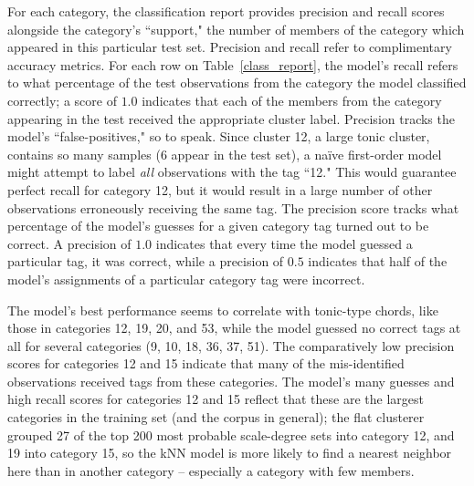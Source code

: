 For each category, the classification report provides precision and recall scores alongside the category's ``support," the number of members of the category which appeared in this particular test set.  Precision and recall refer to complimentary accuracy metrics.  For each row on Table~\ref{class_report}, the model's recall refers to what percentage of the test observations from the category the model classified correctly; a score of $1.0$ indicates that each of the members from the category appearing in the test received the appropriate cluster label.  Precision tracks the model's ``false-positives," so to speak.  Since cluster 12, a large tonic cluster, contains so many samples (6 appear in the test set), a na\"{i}ve first-order model might attempt to label \emph{all} observations with the tag ``12."  This would guarantee perfect recall for category 12, but it would result in a large number of other observations erroneously receiving the same tag.  The precision score tracks what percentage of the model's guesses for a given category tag turned out to be correct.  A precision of $1.0$ indicates that every time the model guessed a particular tag, it was correct, while a precision of $0.5$ indicates that half of the model's assignments of a particular category tag were incorrect.

The model's best performance seems to correlate with tonic-type chords, like those in categories 12, 19, 20, and 53, while the model guessed no correct tags at all for several categories (9, 10, 18, 36, 37, 51).  The comparatively low precision scores for categories 12 and 15 indicate that many of the mis-identified observations received tags from these categories.  The model's many guesses and high recall scores for categories 12 and 15 reflect that these are the largest categories in the training set (and the corpus in general); the flat clusterer grouped 27 of the top 200 most probable scale-degree sets into category 12, and 19 into category 15, so the kNN model is more likely to find a nearest neighbor here than in another category -- especially a category with few members.

